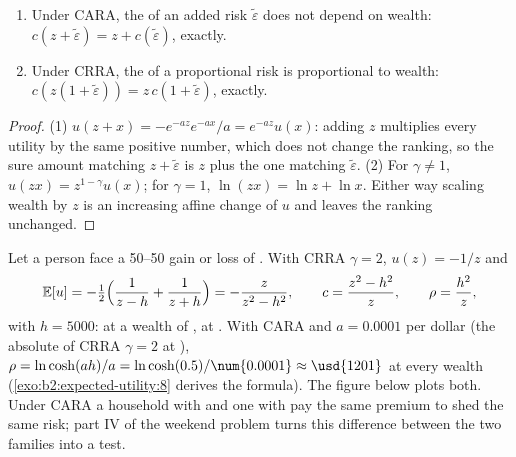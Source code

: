 \begin{proposition}\label{prop:b2:expected-utility:cara-crra}
\begin{enumerate}
  \item Under CARA, the  of an added risk $\tilde\varepsilon$ does not depend on wealth:
        $c(z + \tilde\varepsilon) = z + c(\tilde\varepsilon)$, exactly.
  \item Under CRRA, the  of a proportional risk is proportional to wealth: $c(z(1 +
        \tilde\varepsilon)) = z\,c(1 + \tilde\varepsilon)$, exactly.
\end{enumerate}
\end{proposition}

\begin{proof}
(1) $u(z + x) = -e^{-az}e^{-ax}/a = e^{-az}u(x)$: adding $z$ multiplies every utility by the same
positive number, which does not change the ranking, so the sure amount matching $z + \tilde\varepsilon$
is $z$ plus the one matching $\tilde\varepsilon$. (2) For $\gamma \ne 1$, $u(zx) = z^{1-\gamma}u(x)$;
for $\gamma = 1$, $\ln(zx) = \ln z + \ln x$. Either way scaling wealth by $z$ is an increasing affine
change of $u$ and leaves the ranking unchanged.
\end{proof}

\begin{example}\label{ex:b2:expected-utility:wealth}
Let a person face a 50--50 gain or loss of . With CRRA $\gamma = 2$, $u(z) = -1/z$ and
\[
\mathbb{E}[u] = -\tfrac12\Bigl(\frac{1}{z - h} + \frac{1}{z + h}\Bigr) = -\frac{z}{z^2 - h^2}, \qquad
c = \frac{z^2 - h^2}{z}, \qquad \rho = \frac{h^2}{z},
\]
with $h = \num{5000}$:  at a wealth of ,  at . With CARA and $a =
\num{0.0001}$ per dollar (the absolute  of CRRA $\gamma = 2$ at ), $\rho = \ln\cosh(ah)/a = \ln\cosh(0.5)/\num{0.0001} \approx \usd{1201}$ at every wealth
(\cref{exo:b2:expected-utility:8} derives the formula).
The figure below plots both. Under CARA a household with  and one
with  pay the same premium to shed the same risk; part IV of the weekend problem turns this
difference between the two families into a test.
\end{example}

